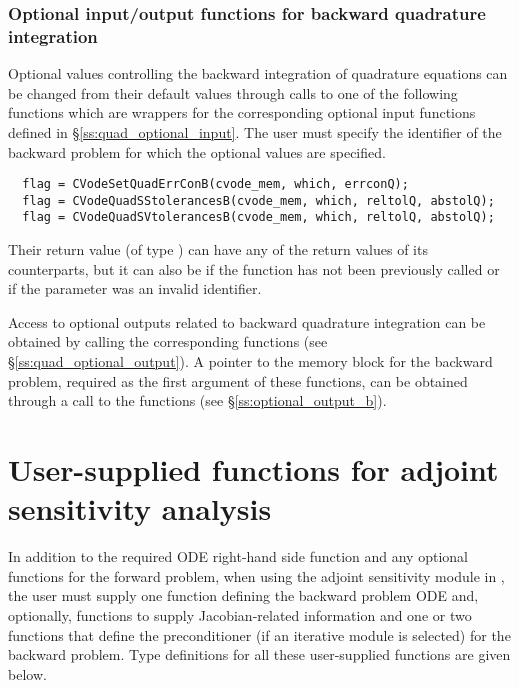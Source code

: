 \subsubsection{Optional input/output functions for backward quadrature integration}
\label{sss:quad_optional_input_B}
Optional values controlling the backward integration of quadrature equations can be
changed from their default values through calls to one of the following functions
which are wrappers for the corresponding optional input functions defined in
\S\ref{ss:quad_optional_input}. The user must specify  the identifier 
of the backward problem for which the optional values are specified.

\begin{verbatim}
  flag = CVodeSetQuadErrConB(cvode_mem, which, errconQ);
  flag = CVodeQuadSStolerancesB(cvode_mem, which, reltolQ, abstolQ);
  flag = CVodeQuadSVtolerancesB(cvode_mem, which, reltolQ, abstolQ);
\end{verbatim}
Their return value  (of type ) can have any of the return values
of its counterparts, but it can also be  if the function
 has not been previously called or  if the
parameter  was an invalid identifier.

Access to optional outputs related to backward quadrature integration can be
obtained by calling the corresponding  functions
(see \S\ref{ss:quad_optional_output}).  A pointer  to the
{\cvodes} memory block for the backward problem, required as the first
argument of these functions, can be obtained through a call to the functions
 (see \S\ref{ss:optional_output_b}).


\section{User-supplied functions for adjoint sensitivity analysis}
\label{ss:user_fct_adj}

In addition to the required ODE right-hand side function and any optional functions
for the forward problem, when using the adjoint sensitivity module in {\cvodes},
the user must supply one function defining the backward problem ODE and, optionally,
functions to supply Jacobian-related information and one or two functions
that define the preconditioner (if an iterative {\sunlinsol} module is
selected) for the backward problem.
Type definitions for all these user-supplied functions are given below.

